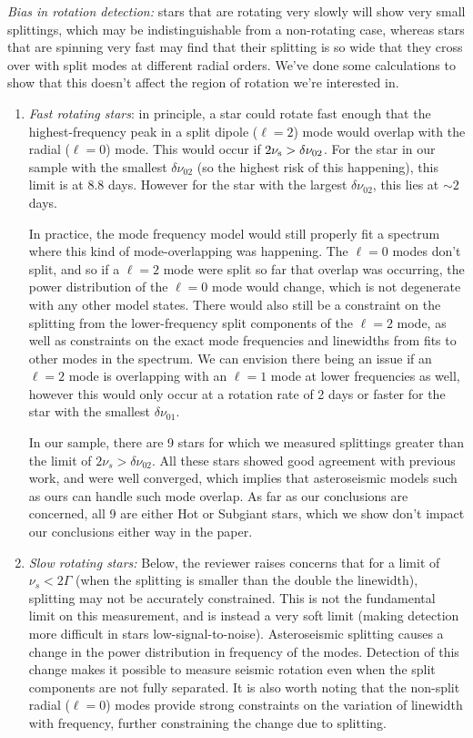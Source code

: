 \documentclass[11pt]{article}
\begin{document}
\textit{Bias in rotation detection:} stars that are rotating very slowly will show very small splittings, which may be indistinguishable from a non-rotating case, whereas stars that are spinning very fast may find that their splitting is so wide that they cross over with split modes at different radial orders. We’ve done some calculations to show that this doesn’t affect the region of rotation we’re interested in.
\begin{enumerate}
\item \textit{Fast rotating stars}: in principle, a star could rotate fast enough that the highest-frequency peak in a split dipole ($\ell=2$) mode would overlap with the radial ($\ell=0$) mode. This would occur if $2\nu_{\rm{s}} > \delta\nu_{02}$. For the star in our sample with the smallest $\delta\nu_{02}$ (so the highest risk of this happening), this limit is at 8.8 days. However for the star with the largest $\delta\nu_{02}$, this lies at $\sim 2$ days. 

In practice, the mode frequency model would still properly fit a spectrum where this kind of mode-overlapping was happening. The $\ell=0$ modes don’t split, and so if a $\ell=2$ mode were split so far that overlap was occurring, the power distribution of the $\ell=0$ mode would change, which is not degenerate with any other model states. There would also still be a constraint on the splitting from the lower-frequency split components of the $\ell=2$ mode, as well as constraints on the exact mode frequencies and linewidths from fits to other modes in the spectrum. We can envision there being an issue if an $\ell=2$ mode is overlapping with an $\ell=1$ mode at lower frequencies as well, however this would only occur at a rotation rate of 2 days or faster for the star with the smallest $\delta\nu_{01}$.
 
In our sample, there are 9 stars for which we measured splittings greater than the limit of $2\nu_s > \delta\nu_{02}$. All these stars showed good agreement with previous work, and were well converged, which implies that asteroseismic models such as ours can handle such mode overlap. As far as our conclusions are concerned, all 9 are either Hot or Subgiant stars, which we show don’t impact our conclusions either way in the paper.

\item \textit{Slow rotating stars:} Below, the reviewer raises concerns that for a limit of $\nu_s < 2\Gamma$ (when the splitting is smaller than the double the linewidth), splitting may not be accurately constrained. This is not the fundamental limit on this measurement, and is instead a very soft limit (making detection more difficult in stars low-signal-to-noise). Asteroseismic splitting causes a change in the power distribution in frequency of the modes. Detection of this change makes it possible to measure seismic rotation even when the split components are not fully separated.  It is also worth noting that the non-split radial ($\ell=0$) modes provide strong constraints on the variation of linewidth with frequency, further constraining the change due to splitting.


\end{enumerate}
\end{document}
